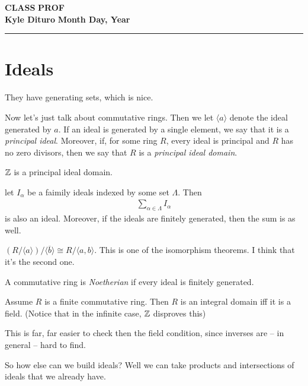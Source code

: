 \documentclass[12pt, twosided]{article}
\begin{document}
\noindent \textbf{CLASS} \hfill \textbf{PROF} \\
\textbf{Kyle Dituro} \hfill \textbf{Month Day\tht, Year}\hrule
\vspace{.2in}

\section{Ideals}

They have generating sets, which is nice.

Now let's just talk about commutative rings. Then we let \(\langle a \rangle\) denote the ideal generated by \(a\). If an ideal is generated by a single element, we say that it is a \textit{principal ideal}. Moreover, if, for some ring \(R\), every ideal is principal and \(R\) has no zero divisors, then we say that \(R\) is a \textit{principal ideal domain}.

\begin{exa}
  \(\mathbb{Z}\) is a principal ideal domain.
\end{exa}

let \(I_\alpha\) be a faimily ideals indexed by some set \(\Lambda\). Then
\begin{align*}
  \sum_{\alpha \in \Lambda} I_\alpha
\end{align*}
is also an ideal. Moreover, if the ideals are finitely generated, then the sum is as well.

\begin{thm}
  \((R/\langle a \rangle) / \langle \overline b \rangle \cong R / \langle a, b \rangle\). This is one of the isomorphism theorems. I think that it's the second one.
\end{thm}

\begin{df}
  A commutative ring is \textit{Noetherian} if every ideal is finitely generated.
\end{df}

\begin{prop}
  Assume \(R\) is a finite commutative ring. Then \(R\) is an integral domain iff it is a field. (Notice that in the infinite case, \(\mathbb{Z}\) disproves this)
\end{prop}

This is far, far easier to check then the field condition, since inverses are -- in general -- hard to find.

So how else can we build ideals? Well we can take products and intersections of ideals that we already have.

\end{document}
